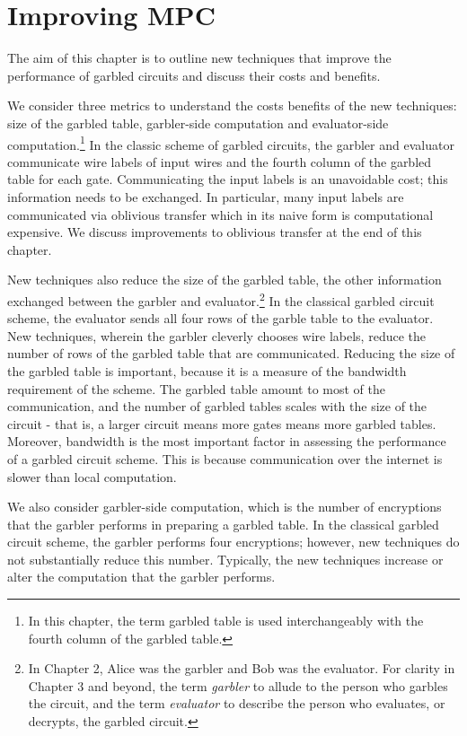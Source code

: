 
\chapter{Improving MPC}

The aim of this chapter is to outline new techniques that improve the performance of garbled circuits and discuss their costs and benefits.

We consider three metrics to understand the costs benefits of the new techniques: size of the garbled table, garbler-side computation and evaluator-side computation.\footnote{In this chapter, the term garbled table is used interchangeably with the fourth column of the garbled table.}
In the classic scheme of garbled circuits, the garbler and evaluator communicate wire labels of input wires and the fourth column of the garbled table for each gate.
Communicating the input labels is an unavoidable cost; this information needs to be exchanged. 
In particular, many input labels are communicated via oblivious transfer which in its naive form is computational expensive. 
We discuss improvements to oblivious transfer at the end of this chapter. 

New techniques also reduce the size of the garbled table, the other information exchanged between the garbler and evaluator.\footnote{In Chapter 2, Alice was the garbler and Bob was the evaluator. For clarity in Chapter 3 and beyond, the term \textit{garbler} to allude to the person who garbles the circuit, and the term \textit{evaluator} to describe the person who evaluates, or decrypts, the garbled circuit.}
In the classical garbled circuit scheme, the evaluator sends all four rows of the garble table to the evaluator.
New techniques, wherein the garbler cleverly chooses wire labels, reduce the number of rows of the garbled table that are communicated.
Reducing the size of the garbled table is important, because it is a measure of the bandwidth requirement of the scheme.
The garbled table amount to most of the communication, and the number of garbled tables scales with the size of the circuit - that is, a larger circuit means more gates means more garbled tables.
Moreover, bandwidth is the most important factor in assessing the performance of a garbled circuit scheme.
This is because communication over the internet is slower than local computation.

We also consider garbler-side computation, which is the number of encryptions that the garbler performs in preparing a garbled table.
In the classical garbled circuit scheme, the garbler performs four encryptions; however, new techniques do not substantially reduce this number.
Typically, the new techniques increase or alter the computation that the garbler performs.

